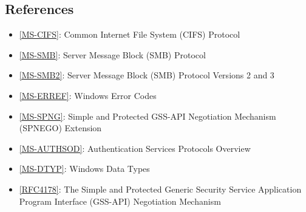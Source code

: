 \documentclass[documentation]{subfiles}
\begin{document}
\subsection{References}
\begin{itemize}
    \item \href{https://msdn.microsoft.com/en-us/library/ee442092.aspx}{[MS-CIFS]}: Common Internet File System (CIFS) Protocol
    \item \href{https://msdn.microsoft.com/en-us/library/cc246231.aspx}{[MS-SMB]}: Server Message Block (SMB) Protocol
    \item \href{https://msdn.microsoft.com/en-us/library/cc246482.aspx}{[MS-SMB2]}: Server Message Block (SMB) Protocol Versions 2 and 3
    \item \href{https://msdn.microsoft.com/en-us/library/cc231196.aspx}{[MS-ERREF]}: Windows Error Codes
    \item \href{https://msdn.microsoft.com/en-us/library/cc247021.aspx}{[MS-SPNG]}: Simple and Protected GSS-API Negotiation Mechanism (SPNEGO) Extension
    \item \href{https://msdn.microsoft.com/en-us/library/gg604662.aspx}{[MS-AUTHSOD]}: Authentication Services Protocols Overview
    \item \href{https://msdn.microsoft.com/en-us/library/cc230273.aspx}{[MS-DTYP]}: Windows Data Types
    \item \href{https://www.ietf.org/rfc/rfc4178.txt}{[RFC4178]}: The Simple and Protected Generic Security Service Application Program Interface (GSS-API) Negotiation Mechanism
\end{itemize}
\end{document}
